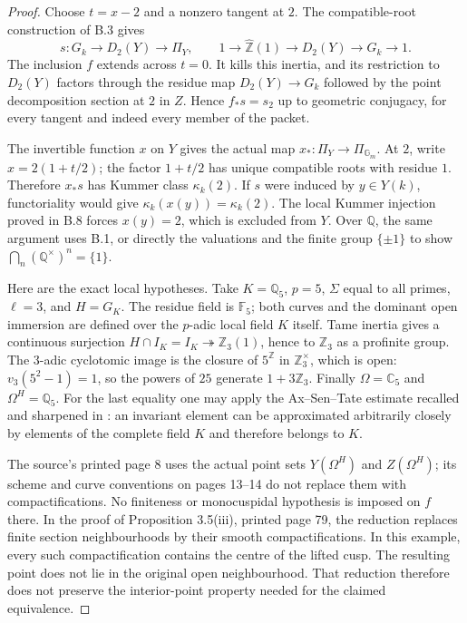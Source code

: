 \documentclass[11pt,oneside]{article}
\begin{document}
\begin{proof}
Choose $t=x-2$ and a nonzero tangent at $2$. The compatible-root
construction of B.3 gives
\[
 s:G_k\longrightarrow D_2(Y)\longrightarrow\Pi_Y,
 \qquad
 1\longrightarrow\widehat{\mathbb Z}(1)
 \longrightarrow D_2(Y)\longrightarrow G_k\longrightarrow1.
\]
The inclusion $f$ extends across $t=0$. It kills this inertia,
and its restriction to $D_2(Y)$ factors through the residue
map $D_2(Y)\to G_k$ followed by the point decomposition
section at $2$ in $Z$. Hence $f_*s=s_2$ up to geometric
conjugacy, for every tangent and indeed every member of
the packet.

The invertible function $x$ on $Y$ gives the actual map
$x_*:\Pi_Y\to\Pi_{\mathbb G_m}$.
At $2$, write $x=2(1+t/2)$; the factor $1+t/2$ has unique
compatible roots with residue $1$. Therefore $x_*s$ has
Kummer class $\kappa_k(2)$. If $s$ were induced by
$y\in Y(k)$, functoriality would give
$\kappa_k(x(y))=\kappa_k(2)$.
The local Kummer injection proved in B.8 forces $x(y)=2$,
which is excluded from $Y$. Over $\mathbb Q$, the same
argument uses B.1, or directly the valuations and the
finite group $\{\pm1\}$ to show
$\bigcap_n(\mathbb Q^\times)^n=\{1\}$.

Here are the exact local hypotheses. Take $K=\mathbb Q_5$,
$p=5$, $\Sigma$ equal to all primes, $\ell=3$, and
$H=G_K$. The residue field is $\mathbb F_5$; both curves
and the dominant open immersion are defined over the
$p$-adic local field $K$ itself. Tame inertia gives a
continuous surjection $H\cap I_K=I_K\twoheadrightarrow
\mathbb Z_3(1)$, hence to $\mathbb Z_3$ as a profinite
group. The $3$-adic cyclotomic image is the closure of
$5^{\mathbb Z}$ in $\mathbb Z_3^\times$, which is open:
$v_3(5^2-1)=1$, so the powers of $25$ generate
$1+3\mathbb Z_3$. Finally
$\Omega=\mathbb C_5$ and $\Omega^H=\mathbb Q_5$.
For the last equality one may apply the Ax--Sen--Tate
estimate recalled and sharpened in \cite{B_LeBorgne}:
an invariant element can be approximated arbitrarily
closely by elements of the complete field $K$ and
therefore belongs to $K$.

The source's printed page 8 uses the actual point sets
$Y(\Omega^H)$ and $Z(\Omega^H)$; its scheme and curve
conventions on pages 13--14 do not replace them with
compactifications. No finiteness or monocuspidal hypothesis
is imposed on $f$ there. In the proof of Proposition
3.5(iii), printed page 79, the reduction replaces finite
section neighbourhoods by their smooth compactifications.
In this example, every such compactification contains
the centre of the lifted cusp. The resulting point
does not lie in the original open neighbourhood.
That reduction therefore does not preserve the
interior-point property needed for the claimed equivalence.
\end{proof}
\end{document}
